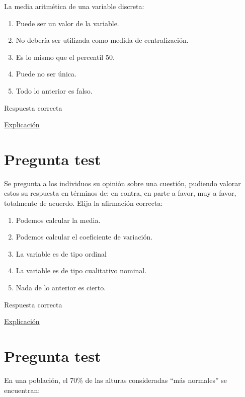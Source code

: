 \documentclass[
]{book}
\providecommand{\tightlist}{%
  \setlength{\itemsep}{0pt}\setlength{\parskip}{0pt}}
\begin{document}
La media aritmética de una variable discreta:

\begin{enumerate}
\def\labelenumi{\alph{enumi})}
\tightlist
\item
  Puede ser un valor de la variable.
\item
  No debería ser utilizada como medida de centralización.
\item
  Es lo mismo que el percentil 50.
\item
  Puede no ser única.
\item
  Todo lo anterior es falso.
\end{enumerate}

Respuesta correcta

\href{https://1fjmanzano.github.io/bioestadistica/medidas-de-posicio\%CC\%81n-dispersio\%CC\%81n-y-forma.html\#medidas-de-posicio\%CC\%81n-centrales}{Explicación}

\hypertarget{pregunta-test-61}{%
\section{Pregunta test}\label{pregunta-test-61}}

Se pregunta a los individuos su opinión sobre una cuestión, pudiendo valorar estos su respuesta en términos de: en contra, en parte a favor, muy a favor, totalmente de acuerdo. Elija la afirmación correcta:

\begin{enumerate}
\def\labelenumi{\alph{enumi})}
\tightlist
\item
  Podemos calcular la media.
\item
  Podemos calcular el coeficiente de variación.
\item
  La variable es de tipo ordinal
\item
  La variable es de tipo cualitativo nominal.
\item
  Nada de lo anterior es cierto.
\end{enumerate}

Respuesta correcta

\href{https://1fjmanzano.github.io/bioestadistica/tipos-de-variables.html}{Explicación}

\hypertarget{pregunta-test-62}{%
\section{Pregunta test}\label{pregunta-test-62}}

En una población, el 70\% de las alturas consideradas ``más normales'' se encuentran:
\end{document}
